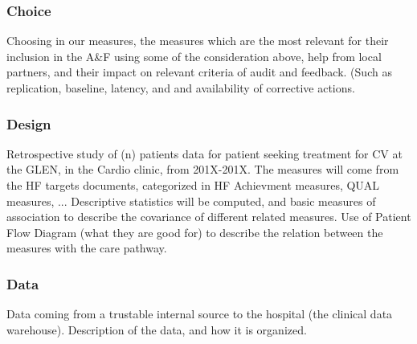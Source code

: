 \subsubsection{Choice}
Choosing in our measures, the measures which are the most relevant for their inclusion in the A\&F using some of the consideration above, help from local partners, and their impact on relevant criteria of audit and feedback. (Such as replication, baseline, latency, and and availability of corrective actions.

\subsubsection{Design}
Retrospective study of (n) patients data for patient seeking treatment for CV at the GLEN, in the Cardio clinic, from 201X-201X. The measures will come from the HF targets documents, categorized in HF Achievment measures, QUAL measures, ... Descriptive statistics will be computed, and basic measures of association to describe the covariance of different related measures. Use of Patient Flow Diagram (what they are good for) to describe the relation between the measures with the care pathway.

\subsubsection{Data}
Data coming from a trustable internal source to the hospital (the clinical data warehouse). Description of the data, and how it is organized.
